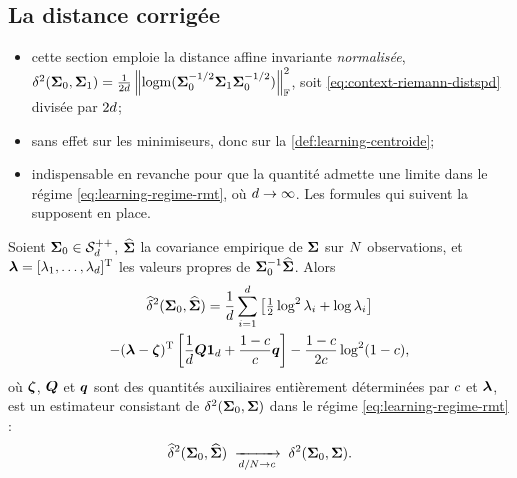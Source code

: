 \subsection{La distance corrigée}
\label{subsec:learning-distance-corrigee}

\begin{remark}
\label{rem:learning-normalisation}
  \begin{itemize}
    \item cette section emploie la distance affine invariante
      \emph{normalisée},
      $\delta^2(\boldsymbol{\Sigma}_0,\boldsymbol{\Sigma}_1)=\frac{1}{2d}\left\lVert\operatorname{\operatorname{logm}}(\boldsymbol{\Sigma}_0^{-1/2}\boldsymbol{\Sigma}_1\boldsymbol{\Sigma}_0^{-1/2})\right\rVert_{\mathbb{F}}^2$,
      soit \cref{eq:context-riemann-distspd} divisée par $2d$;
    \item sans effet sur les minimiseurs, donc sur la
      \cref{def:learning-centroide};
    \item indispensable en revanche pour que la quantité admette une limite
      dans le régime \cref{eq:learning-regime-rmt}, où $d\to\infty$. Les
      formules qui suivent la supposent en place.
  \end{itemize}
  \leavevmode
\end{remark}

\begin{proposition}
\label{prop:learning-distance-corrigee}
  Soient $\boldsymbol{\Sigma}_0\in\mathcal{S}_{d}^{++}$, $\widehat{\boldsymbol{\Sigma}}$ la covariance empirique de $\boldsymbol{\Sigma}$ sur
  $N$ observations, et
  $\boldsymbol{\lambda}=[\lambda_1,\dots,\lambda_{d}]^{\mathrm{T}}$ les valeurs propres de
  $\boldsymbol{\Sigma}_0^{-1}\widehat{\boldsymbol{\Sigma}}$. Alors
  \begin{multline}
    \widehat{\delta}^2(\boldsymbol{\Sigma}_0,\widehat{\boldsymbol{\Sigma}})
    =
    \frac{1}{d}\sum_{i=1}^{d}
    \left[\tfrac{1}{2}\log^2\lambda_i+\log\lambda_i\right]
    \\
    -(\boldsymbol{\lambda}-\boldsymbol{\zeta})^{\mathrm{T}}
    \left[\frac{1}{d}\boldsymbol{Q}\boldsymbol{1}_{d}+\frac{1-c}{c}\boldsymbol{q}\right]
    -\frac{1-c}{2c}\log^2(1-c),
    \label{eq:learning-distance-corrigee}
  \end{multline}
  où $\boldsymbol{\zeta}$, $\boldsymbol{Q}$ et $\boldsymbol{q}$ sont des quantités auxiliaires
  entièrement déterminées par $c$ et $\boldsymbol{\lambda}$, est un estimateur
  consistant de $\delta^2(\boldsymbol{\Sigma}_0,\boldsymbol{\Sigma})$ dans le régime
  \cref{eq:learning-regime-rmt}
  :
  \begin{equation}
    \widehat{\delta}^2(\boldsymbol{\Sigma}_0,\widehat{\boldsymbol{\Sigma}})
    \;\xrightarrow[d/N\to c]{}\;
    \delta^2(\boldsymbol{\Sigma}_0,\boldsymbol{\Sigma}).
    \label{eq:learning-consistance}
  \end{equation}
\end{proposition}

